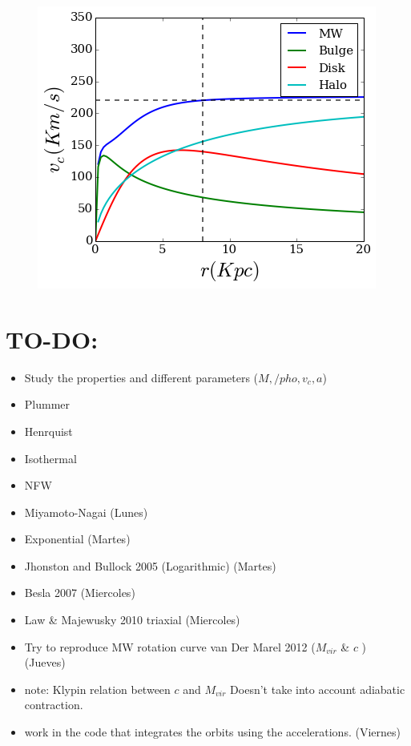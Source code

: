 \documentclass[a4paper, 12pt]{article} %
\begin{document}
\begin{figure}[H]\label{MWBesla07}
\centering
\includegraphics[scale=0.7]{MWBEsla07.png}
\end{figure}

\section{TO-DO:}

\begin{itemize}

\item Study the properties and different parameters ($M, /pho, v_c, a$)

\item Plummer
\item Henrquist
\item Isothermal
\item NFW
\item Miyamoto-Nagai (Lunes)
\item Exponential (Martes)
\item Jhonston and Bullock 2005 (Logarithmic) (Martes)
\item Besla 2007 (Miercoles)
\item Law \& Majewusky 2010 triaxial (Miercoles)

\item Try to reproduce MW rotation curve van Der Marel 2012 ($M_{vir}$ \& $c$ ) (Jueves)


\item note: Klypin relation between $c$ and $M_{vir}$ Doesn't take into 
account adiabatic contraction. 

\item work in the code that integrates the orbits using the accelerations. (Viernes)

\end{itemize}



\end{document}
